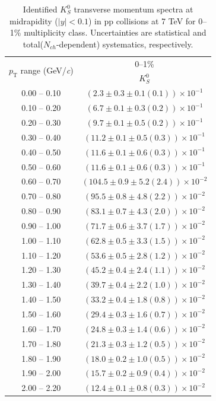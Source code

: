 \begin{table}
\caption{Identified $K^{0}_{S}$ transverse momentum spectra at midrapidity ($|y|<0.1$) in pp collisions at 7 TeV for 0--1\% multiplicity class. Uncertainties are statistical and total($N_{ch}$-dependent) systematics, respectively.}
\label{tab:K0Short_0to1}
\begin{center}
\begin{tabular}{ c | c }
\hline
\multirow{2}{*}{$p_{\mathrm{T}}$ range (GeV/\textit{c})} & \multicolumn{1}{c}{0--1\%} \\ & $K^{0}_{S}$\\ 
\hline
0.00 -- 0.10 & $(2.3\pm0.3\pm0.1(0.1))\times10^{-1}$ \\ 
0.10 -- 0.20 & $(6.7\pm0.1\pm0.3(0.2))\times10^{-1}$ \\ 
0.20 -- 0.30 & $(9.7\pm0.1\pm0.5(0.2))\times10^{-1}$ \\ 
0.30 -- 0.40 & $(11.2\pm0.1\pm0.5(0.3))\times10^{-1}$ \\ 
0.40 -- 0.50 & $(11.6\pm0.1\pm0.6(0.3))\times10^{-1}$ \\ 
0.50 -- 0.60 & $(11.6\pm0.1\pm0.6(0.3))\times10^{-1}$ \\ 
0.60 -- 0.70 & $(104.5\pm0.9\pm5.2(2.4))\times10^{-2}$ \\ 
0.70 -- 0.80 & $(95.5\pm0.8\pm4.8(2.2))\times10^{-2}$ \\ 
0.80 -- 0.90 & $(83.1\pm0.7\pm4.3(2.0))\times10^{-2}$ \\ 
0.90 -- 1.00 & $(71.7\pm0.6\pm3.7(1.7))\times10^{-2}$ \\ 
1.00 -- 1.10 & $(62.8\pm0.5\pm3.3(1.5))\times10^{-2}$ \\ 
1.10 -- 1.20 & $(53.6\pm0.5\pm2.8(1.2))\times10^{-2}$ \\ 
1.20 -- 1.30 & $(45.2\pm0.4\pm2.4(1.1))\times10^{-2}$ \\ 
1.30 -- 1.40 & $(39.7\pm0.4\pm2.2(1.0))\times10^{-2}$ \\ 
1.40 -- 1.50 & $(33.2\pm0.4\pm1.8(0.8))\times10^{-2}$ \\ 
1.50 -- 1.60 & $(29.4\pm0.3\pm1.6(0.7))\times10^{-2}$ \\ 
1.60 -- 1.70 & $(24.8\pm0.3\pm1.4(0.6))\times10^{-2}$ \\ 
1.70 -- 1.80 & $(21.3\pm0.3\pm1.2(0.5))\times10^{-2}$ \\ 
1.80 -- 1.90 & $(18.0\pm0.2\pm1.0(0.5))\times10^{-2}$ \\ 
1.90 -- 2.00 & $(15.7\pm0.2\pm0.9(0.4))\times10^{-2}$ \\ 
2.00 -- 2.20 & $(12.4\pm0.1\pm0.8(0.3))\times10^{-2}$ \\ 

\end{tabular}
\end{center}
\end{table}
